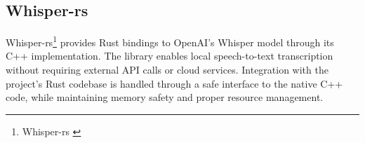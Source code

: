 \subsection{Whisper-rs}
Whisper-rs\footnote{Whisper-rs \cite{whisper-rs}} provides Rust bindings to OpenAI's Whisper model through its C++ implementation.
The library enables local speech-to-text transcription without requiring external API calls or cloud services.
Integration with the project's Rust codebase is handled through a safe interface to the native C++ code,
while maintaining memory safety and proper resource management.
